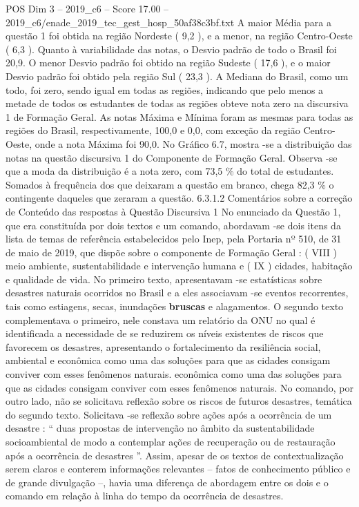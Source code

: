 \begin{textsample}{POS Dim 3 – 2019\_c6 – Score 17.00 – 2019\_c6/enade\_2019\_tec\_gest\_hosp\_50af38c3bf.txt}
A maior Média para a questão 1 foi obtida na região Nordeste ( 9,2 ), e a menor, na região Centro-Oeste ( 6,3 ).
Quanto à variabilidade das notas, o Desvio padrão de todo o Brasil foi 20,9.
O menor Desvio padrão foi obtido na região Sudeste ( 17,6 ), e o maior Desvio padrão foi obtido pela região Sul ( 23,3 ).
A Mediana do Brasil, como um todo, foi zero, sendo igual em todas as regiões, indicando que pelo menos a metade de todos os estudantes de todas as regiões obteve nota zero na discursiva 1 de Formação Geral.
As notas Máxima e Mínima foram as mesmas para todas as regiões do Brasil, respectivamente, 100,0 e 0,0, com exceção da região Centro-Oeste, onde a nota Máxima foi 90,0.
No Gráfico 6.7, mostra -se a distribuição das notas na questão discursiva 1 do Componente de Formação Geral.
Observa -se que a moda da distribuição é a nota zero, com 73,5 \% do total de estudantes.
Somados à frequência dos que deixaram a questão em branco, chega 82,3 \% o contingente daqueles que zeraram a questão. 6.3.1.2 Comentários sobre a correção de Conteúdo das respostas à Questão Discursiva 1 No enunciado da Questão 1, que era constituída por dois textos e um comando, abordavam -se dois itens da lista de temas de referência estabelecidos pelo Inep, pela Portaria nº 510, de 31 de maio de 2019, que dispõe sobre o componente de Formação Geral : ( VIII ) meio ambiente, sustentabilidade e intervenção humana e ( IX ) cidades, habitação e qualidade de vida.
No primeiro texto, apresentavam -se estatísticas sobre desastres naturais ocorridos no Brasil e a eles associavam -se eventos recorrentes, tais como estiagens, secas, inundações \textbf{bruscas} e alagamentos.
O segundo texto complementava o primeiro, nele constava um relatório da ONU no qual é identificada a necessidade de se reduzirem os níveis existentes de riscos que favorecem os desastres, apresentando o fortalecimento da resiliência social, ambiental e econômica como uma das soluções para que as cidades consigam conviver com esses fenômenos naturais. econômica como uma das soluções para que as cidades consigam conviver com esses fenômenos naturais.
No comando, por outro lado, não se solicitava reflexão sobre os riscos de futuros desastres, temática do segundo texto.
Solicitava -se reflexão sobre ações após a ocorrência de um desastre : “ duas propostas de intervenção no âmbito da sustentabilidade socioambiental de modo a contemplar ações de recuperação ou de restauração após a ocorrência de desastres ”.
Assim, apesar de os textos de contextualização serem claros e conterem informações relevantes – fatos de conhecimento público e de grande divulgação –, havia uma diferença de abordagem entre os dois e o comando em relação à linha do tempo da ocorrência de desastres.

\end{textsample}
